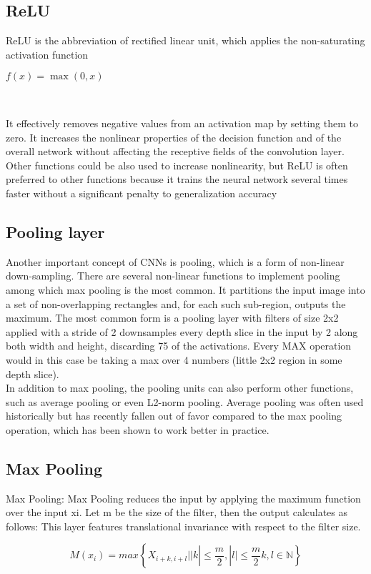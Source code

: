 \subsection{ReLU}
ReLU is the abbreviation of rectified linear unit, which applies the non-saturating activation function\\
\begin{center}
    \begin{large}
        $f(x)=\max(0,x)$
    \end{large} \\
\end{center}
It effectively removes negative values from an activation map by setting them to zero. It increases the nonlinear properties of the decision function and of the overall network without affecting the receptive fields of the convolution layer.\\
Other functions could be also used to increase nonlinearity, but ReLU is often preferred to other functions because it trains the neural network several times faster without a significant penalty to generalization accuracy

\subsection{Pooling layer}
Another important concept of CNNs is pooling, which is a form of non-linear down-sampling. There are several non-linear functions to implement pooling among which max pooling is the most common. It partitions the input image into a set of non-overlapping rectangles and, for each such sub-region, outputs the maximum. The most common form is a pooling layer with filters of size 2x2 applied with a stride of 2 downsamples every depth slice in the input by 2 along both width and height, discarding 75 %
of the activations. Every MAX operation would in this case be taking a max over 4 numbers (little 2x2 region in some depth slice). \\
In addition to max pooling, the pooling units can also perform other functions, such as average pooling or even L2-norm pooling. Average pooling was often used historically but has recently fallen out of favor compared to the max pooling operation, which has been shown to work better in practice.\\

\subsection{Max Pooling}
Max Pooling: Max Pooling reduces the input by applying the maximum function over the input xi. Let m be the size of the filter, then the output calculates as follows:
This layer features translational invariance with respect to the filter size.
\begin{center}
    \begin{large}
        $$M(x_i)=max\left \{X_{i+k,i+l}||k|\leq \frac{m}{2},|l|\leq \frac{m}{2}k,l\in \mathbb{N}\right \}$$
    \end{large} \\
\end{center}

